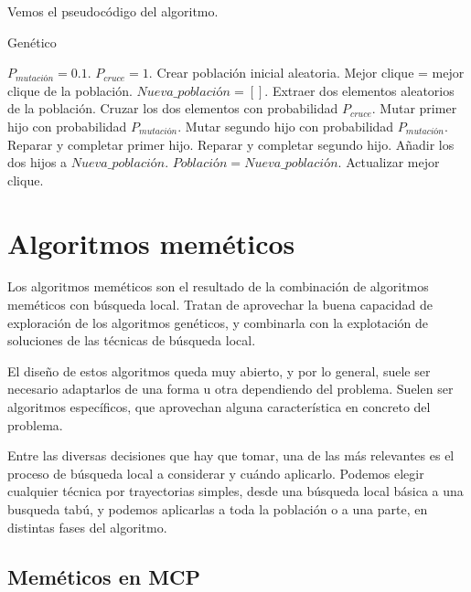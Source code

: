 Vemos el pseudocódigo del algoritmo.

\begin{algorithm}[H]
\caption{Genético}
  \begin{algorithmic}
    \State $P_{mutación} = 0.1$.
    \State $P_{cruce} = 1$.
    \State Crear población inicial aleatoria.
    \State Mejor clique = mejor clique de la población.
    \Repeat
      \State $Nueva\_población = []$.
      \Repeat
        \State Extraer dos elementos aleatorios de la población.
        \State Cruzar los dos elementos con probabilidad $P_{cruce}$.
        \State Mutar primer hijo con probabilidad $P_{mutación}$.
        \State Mutar segundo hijo con probabilidad $P_{mutación}$.
        \State Reparar y completar primer hijo.
        \State Reparar y completar segundo hijo.
        \State Añadir los dos hijos a $Nueva\_población$.
      \State $Población = Nueva\_población$.
      \State Actualizar mejor clique.
  \EndFunction
  \end{algorithmic}
\end{algorithm}


\section{Algoritmos meméticos}\label{memeticos}

Los algoritmos meméticos son el resultado de la combinación de algoritmos meméticos
con búsqueda local. Tratan de aprovechar la buena capacidad de exploración de los
algoritmos genéticos, y combinarla con la explotación de soluciones de las técnicas
de búsqueda local.

El diseño de estos algoritmos queda muy abierto, y por lo general, suele ser necesario
adaptarlos de una forma u otra dependiendo del problema. Suelen ser algoritmos específicos,
que aprovechan alguna característica en concreto del problema.

Entre las diversas decisiones que hay que tomar, una de las más relevantes es el
proceso de búsqueda local a considerar y cuándo aplicarlo. Podemos elegir cualquier
técnica por trayectorias simples, desde una búsqueda local básica a una busqueda
tabú, y podemos aplicarlas a toda la población o a una parte, en distintas
fases del algoritmo.

\subsection{Meméticos en MCP}

